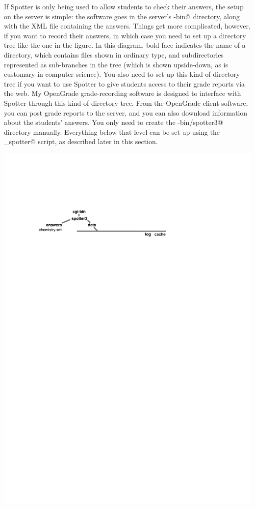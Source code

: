 \documentclass{doc}
\begin{document}

If Spotter is only being used to allow students to check their answers, the
setup on the server is simple: the software goes in the server's \verb@cgi-bin@
directory, along with the XML file containing the answers. Things get more
complicated, however, if you want to record their answers, in which case
you need to set up a directory tree like the one in the figure. In this
diagram, bold-face indicates the name of a directory, which contains files
shown in ordinary type, and subdirectories represented as sub-branches in
the tree (which is shown upside-down, as is customary in computer science).
You also need to set up this kind of directory tree if you want to use Spotter
to give students access to their grade reports via the web. My OpenGrade
grade-recording software is designed to interface with Spotter through this
kind of directory tree. From the OpenGrade client software, you 
can post grade reports to the server, and you can also download information
about the students' answers. You only need to create the \verb@cgi-bin/spotter3@
directory manually. Everything below that level can be set up using the
\verb@admin_spotter@ script, as described later in this section.

\noindent\includegraphics{doc_figs/file-tree}\label{interfacing}
\end{document}
